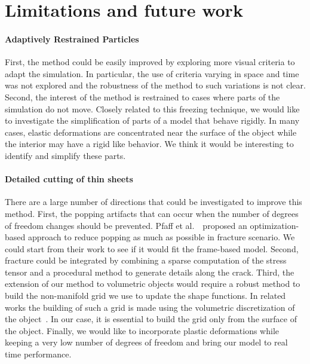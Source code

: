 \section{Limitations and future work}

\paragraph{Adaptively Restrained Particles} First, the method could be easily improved by exploring more visual criteria to adapt the simulation. 
In particular, the use of criteria varying in space and time was not explored and the robustness of the method to such variations is not clear. 
Second, the interest of the method is restrained to cases where parts of the simulation do not move. 
Closely related to this freezing technique, we would like to investigate the simplification of parts of a model that behave rigidly. 
In many cases, elastic deformations are concentrated near the surface of the object while the interior may have a rigid like behavior. 
We think it would be interesting to identify and simplify these parts.

\paragraph{Detailed cutting of thin sheets} There are a large number of directions that could be investigated to improve this method. 
First, the popping artifacts that can occur when the number of degrees of freedom changes should be prevented. 
Pfaff et al.~\cite{Pfaff2014}~proposed an optimization-based approach to reduce popping as much as possible in fracture scenario.
We could start from their work to see if it would fit the frame-based model.
Second, fracture could be integrated by combining a sparse computation of the stress tensor and a procedural method to generate details along the crack. 
Third, the extension of our method to volumetric objects would require a robust method to build the non-manifold grid we use to update the shape functions. 
In related works the building of such a grid is made using the volumetric discretization of the object~\cite{Mitchell2015a,Mitchell2015b}. 
In our case, it is essential to build the grid only from the surface of the object. 
Finally, we would like to incorporate plastic deformations while keeping a very low number of degrees of freedom and bring our model to real time performance.

